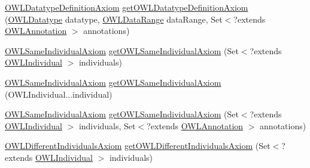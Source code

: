 \begin{DoxyCompactItemize}
\item 
\hyperlink{interfaceorg_1_1semanticweb_1_1owlapi_1_1model_1_1_o_w_l_datatype_definition_axiom}{O\-W\-L\-Datatype\-Definition\-Axiom} \hyperlink{interfaceorg_1_1semanticweb_1_1owlapi_1_1model_1_1_o_w_l_data_factory_a7127c4fccf312eccef9461e8f90027ee}{get\-O\-W\-L\-Datatype\-Definition\-Axiom} (\hyperlink{interfaceorg_1_1semanticweb_1_1owlapi_1_1model_1_1_o_w_l_datatype}{O\-W\-L\-Datatype} datatype, \hyperlink{interfaceorg_1_1semanticweb_1_1owlapi_1_1model_1_1_o_w_l_data_range}{O\-W\-L\-Data\-Range} data\-Range, Set$<$?extends \hyperlink{interfaceorg_1_1semanticweb_1_1owlapi_1_1model_1_1_o_w_l_annotation}{O\-W\-L\-Annotation} $>$ annotations)
\item 
\hyperlink{interfaceorg_1_1semanticweb_1_1owlapi_1_1model_1_1_o_w_l_same_individual_axiom}{O\-W\-L\-Same\-Individual\-Axiom} \hyperlink{interfaceorg_1_1semanticweb_1_1owlapi_1_1model_1_1_o_w_l_data_factory_af1cf12be9cd3d966b420bd8e71395e2d}{get\-O\-W\-L\-Same\-Individual\-Axiom} (Set$<$?extends \hyperlink{interfaceorg_1_1semanticweb_1_1owlapi_1_1model_1_1_o_w_l_individual}{O\-W\-L\-Individual} $>$ individuals)
\item 
\hyperlink{interfaceorg_1_1semanticweb_1_1owlapi_1_1model_1_1_o_w_l_same_individual_axiom}{O\-W\-L\-Same\-Individual\-Axiom} \hyperlink{interfaceorg_1_1semanticweb_1_1owlapi_1_1model_1_1_o_w_l_data_factory_a554ea3cbaaebd69e4082867adf611fc0}{get\-O\-W\-L\-Same\-Individual\-Axiom} (O\-W\-L\-Individual...\-individual)
\item 
\hyperlink{interfaceorg_1_1semanticweb_1_1owlapi_1_1model_1_1_o_w_l_same_individual_axiom}{O\-W\-L\-Same\-Individual\-Axiom} \hyperlink{interfaceorg_1_1semanticweb_1_1owlapi_1_1model_1_1_o_w_l_data_factory_a8209566cee2e3e4d9e8b1c9cc872c0ed}{get\-O\-W\-L\-Same\-Individual\-Axiom} (Set$<$?extends \hyperlink{interfaceorg_1_1semanticweb_1_1owlapi_1_1model_1_1_o_w_l_individual}{O\-W\-L\-Individual} $>$ individuals, Set$<$?extends \hyperlink{interfaceorg_1_1semanticweb_1_1owlapi_1_1model_1_1_o_w_l_annotation}{O\-W\-L\-Annotation} $>$ annotations)
\item 
\hyperlink{interfaceorg_1_1semanticweb_1_1owlapi_1_1model_1_1_o_w_l_different_individuals_axiom}{O\-W\-L\-Different\-Individuals\-Axiom} \hyperlink{interfaceorg_1_1semanticweb_1_1owlapi_1_1model_1_1_o_w_l_data_factory_a6018a162e5108e65ebde53922b98a5d3}{get\-O\-W\-L\-Different\-Individuals\-Axiom} (Set$<$?extends \hyperlink{interfaceorg_1_1semanticweb_1_1owlapi_1_1model_1_1_o_w_l_individual}{O\-W\-L\-Individual} $>$ individuals)
\item 

\end{DoxyCompactItemize}
